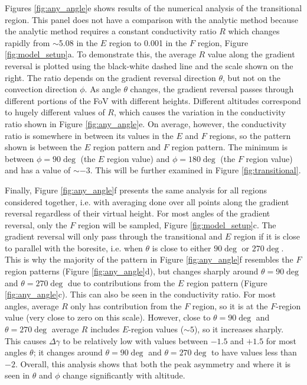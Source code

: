 Figures \ref{fig:any_angle}e shows results of the numerical analysis of the transitional region. This panel does not have a comparison with the analytic method because the analytic method requires a constant conductivity ratio \(R\) which changes rapidly from \(\sim\)5.08 in the \(E\) region to 0.001 in the \(F\) region, Figure \ref{fig:model_setup}a. To demonstrate this, the average \(R\) value along the gradient reversal is plotted using the black-white dashed line and the scale shown on the right. The ratio depends on the gradient reversal direction \(\theta\), but not on the convection direction \(\phi\).  As angle \(\theta\) changes, the gradient reversal passes through different portions of the FoV with different heights. Different altitudes correspond to hugely different values of \(R\), which causes the variation in the conductivity ratio shown in Figure \ref{fig:any_angle}e. On average, however, the conductivity ratio is somewhere in between its values in the \(E\) and \(F\) regions, so the pattern shown is between the \(E\) region pattern and \(F\) region pattern. The minimum is between \(\phi=90\deg\) (the \(E\) region value) and \(\phi=180\deg\) (the \(F\) region value) and has a value of \(\sim -3\). This will be further examined in Figure \ref{fig:transitional}.



Finally, Figure \ref{fig:any_angle}f presents the same analysis for all regions considered together, i.e. with averaging done over all points along the gradient reversal regardless of their virtual height. For most angles of the gradient reversal, only the \(F\) region will be sampled, Figure \ref{fig:model_setup}c. The gradient reversal will only pass through the transitional and \(E\) region if it is close to parallel with the boresite, i.e. when \(\theta\) is close to either \(90\deg\) or \(270\deg\).  This is why the majority of the pattern in Figure \ref{fig:any_angle}f resembles the \(F\) region patterns (Figure \ref{fig:any_angle}d), but changes sharply around \(\theta=90\deg\) and \(\theta=270\deg\) due to contributions from the \(E\) region pattern (Figure \ref{fig:any_angle}c).  This can also be seen in the conductivity ratio. For most angles, average \(R\) only has contribution from the \(F\) region, so it is at the \(F\)-region value (very close to zero on this scale).  However, close to \(\theta=90\deg\) and \(\theta=270\deg\) average \(R\) includes \(E\)-region values (\(\sim5\)), so it increases sharply.  This causes \(\Delta\gamma\) to be relatively low with values between \(-1.5\) and \(+1.5\) for most angles \(\theta\); it changes around \(\theta=90\deg\) and \(\theta=270\deg\) to have values less than \(-2\).  Overall, this analysis shows that both the peak asymmetry and where it is seen in \(\theta\) and \(\phi\) change significantly with altitude.




